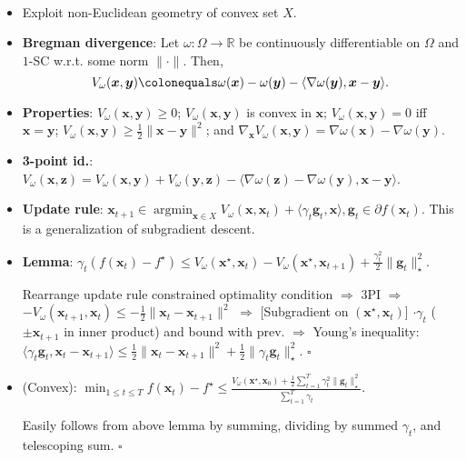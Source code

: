 \documentclass[8pt,a4paper]{extarticle}
\renewcommand{\proof}[1]{\begin{tcolorbox}#1 \hfill $\square$\end{tcolorbox}}
\DeclareMathOperator*{\argmin}{argmin}
\newcommand{\R}{\mathbb{R}}
\renewcommand{\vec}[1]{\bm{#1}}
\newenvironment{topic}[1]
{\textbf{\sffamily \colorbox{black}{\rlap{\textbf{\textcolor{white}{#1}}}\hspace{\linewidth}\hspace{-2\fboxsep}}} \\ \vspace{0.2cm}}
{}
\begin{document}
\begin{multicols*}{2}
    \begin{topic}{Mirror descent}
        \begin{itemize}
            \item Exploit non-Euclidean geometry of convex set $X$.
            \item \textbf{Bregman divergence}: Let $\omega: \Omega \to \R$ be continuously differentiable on $\Omega$ and $1$-SC w.r.t. some norm $\| \cdot \|$. Then, \[
                      V_{\omega}(\vec{x}, \vec{y}) \colonequals \omega(\vec{x}) - \omega(\vec{y}) - \langle \nabla \omega(\vec{y}), \vec{x} - \vec{y} \rangle.
                  \]
            \item \textbf{Properties}: $V_{\omega}(\vec{x}, \vec{y}) \geq 0$; $V_{\omega}(\vec{x}, \vec{y})$ is convex in $\vec{x}$; $V_{\omega}(\vec{x}, \vec{y}) = 0$ iff $\vec{x} = \vec{y}$; $V_{\omega}(\vec{x}, \vec{y}) \geq \frac{1}{2} \| \vec{x} - \vec{y} \|^2$; and $\nabla_{\vec{x}} V_{\omega}(\vec{x},  \vec{y}) = \nabla \omega(\vec{x}) - \nabla \omega(\vec{y})$.
            \item \textbf{3-point id.}: $V_{\omega}(\vec{x}, \vec{z}) = V_{\omega}(\vec{x}, \vec{y}) + V_{\omega}(\vec{y}, \vec{z}) - \langle \nabla \omega(\vec{z}) - \nabla \omega(\vec{y}), \vec{x} - \vec{y} \rangle$.
            \item \textbf{Update rule}: $\vec{x}_{t+1} \in \argmin_{\vec{x} \in X} V_{\omega}(\vec{x}, \vec{x}_t) + \langle \gamma_t \vec{g}_t, \vec{x} \rangle, \vec{g}_t \in \partial f(\vec{x}_t)$. This is a generalization of subgradient descent.
            \item \textbf{Lemma}: $\gamma_t(f(\vec{x}_t) - f^\star) \leq V_{\omega}(\vec{x}^\star, \vec{x}_t) - V_{\omega}(\vec{x}^\star, \vec{x}_{t+1}) + \frac{\gamma_t^2}{2} \| \vec{g}_t \|_\star^2$.
                  \proof{Rearrange update rule constrained optimality condition $\Rightarrow$ 3PI $\Rightarrow$ $-V_{\omega}(\vec{x}_{t+1}, \vec{x}_t) \leq -\frac{1}{2}\| \vec{x}_t - \vec{x}_{t+1} \|^2$ $\Rightarrow$ [Subgradient on $(\vec{x}^\star, \vec{x}_t)$] $\cdot \gamma_t$ ($\pm \vec{x}_{t+1}$ in inner product) and bound with prev. $\Rightarrow$ Young's inequality: $\langle \gamma_t \vec{g}_t, \vec{x}_t - \vec{x}_{t+1} \rangle \leq \frac{1}{2} \| \vec{x}_t - \vec{x}_{t+1} \|^2 + \frac{1}{2} \| \gamma_t \vec{g}_t \|^2_\star$.}
            \item (Convex): $\min_{1\leq t\leq T} f(\vec{x}_t) - f^\star \leq \frac{V_{\omega}(\vec{x}^\star, \vec{x}_0) + \frac{1}{2} \sum_{t=1}^{T} \gamma_t^2 \| \vec{g}_t \|_\star^2}{\sum_{t=1}^{T} \gamma_t}$.
                  \proof{Easily follows from above lemma by summing, dividing by summed $\gamma_t$, and telescoping sum.}
        \end{itemize}
    \end{topic}


\end{multicols*}
\end{document}
